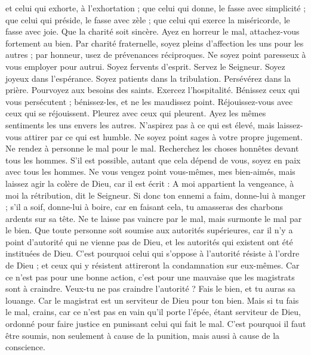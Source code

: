 \begin{multicols}{2}
et celui qui exhorte, à l’exhortation ; que celui qui donne, le fasse avec simplicité ; que celui qui préside, le fasse avec zèle ; que celui qui exerce la miséricorde, le fasse avec joie.
Que la charité soit sincère. Ayez en horreur le mal, attachez-vous fortement au bien.
Par charité fraternelle, soyez pleins d’affection les uns pour les autres ; par honneur, usez de prévenances réciproques.
Ne soyez point paresseux à vous employer pour autrui. Soyez fervents d'esprit. Servez le Seigneur.
Soyez joyeux dans l'espérance. Soyez patients dans la tribulation. Persévérez dans la prière.
Pourvoyez aux besoins des saints. Exercez l'hospitalité.
Bénissez ceux qui vous persécutent ; bénissez-les, et ne les maudissez point.
Réjouissez-vous avec ceux qui se réjouissent. Pleurez avec ceux qui pleurent.
Ayez les mêmes sentiments les uns envers les autres. N’aspirez pas à ce qui est élevé, mais laissez-vous attirer par ce qui est humble. Ne soyez point sages à votre propre jugement.
Ne rendez à personne le mal pour le mal. Recherchez les choses honnêtes devant tous les hommes.
S’il est possible, autant que cela dépend de vous, soyez en paix avec tous les hommes.
Ne vous vengez point vous-mêmes, mes bien-aimés, mais laissez agir la colère de Dieu, car il est écrit : A moi appartient la vengeance, à moi la rétribution, dit le Seigneur.
Si donc ton ennemi a faim, donne-lui à manger ; s'il a soif, donne-lui à boire, car en faisant cela, tu amasseras des charbons ardents sur sa tête.
Ne te laisse pas vaincre par le mal, mais surmonte le mal par le bien.
\VerseOne{}Que toute personne soit soumise aux autorités supérieures, car il n'y a point d’autorité qui ne vienne pas de Dieu, et les autorités qui existent ont été instituées de Dieu.
C'est pourquoi celui qui s’oppose à l’autorité résiste à l’ordre de Dieu ; et ceux qui y résistent attireront la condamnation sur eux-mêmes.
Car ce n’est pas pour une bonne action, c’est pour une mauvaise que les magistrats sont à craindre. Veux-tu ne pas craindre l’autorité ? Fais le bien, et tu auras sa louange.
Car le magistrat est un serviteur de Dieu pour ton bien. Mais si tu fais le mal, crains, car ce n’est pas en vain qu’il porte l'épée, étant serviteur de Dieu, ordonné pour faire justice en punissant celui qui fait le mal.
C'est pourquoi il faut être soumis, non seulement à cause de la punition, mais aussi à cause de la conscience.

\end{multicols}
